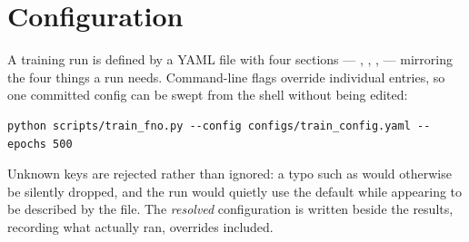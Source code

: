 \section{Configuration}

A training run is defined by a YAML file with four sections --- ,
, ,  --- mirroring the four things a run
needs. Command-line flags override individual entries, so one committed config
can be swept from the shell without being edited:

\begin{lstlisting}
python scripts/train_fno.py --config configs/train_config.yaml --epochs 500
\end{lstlisting}

Unknown keys are rejected rather than ignored: a typo such as 
would otherwise be silently dropped, and the run would quietly use the default
while appearing to be described by the file. The \emph{resolved} configuration
is written beside the results, recording what actually ran, overrides included.
